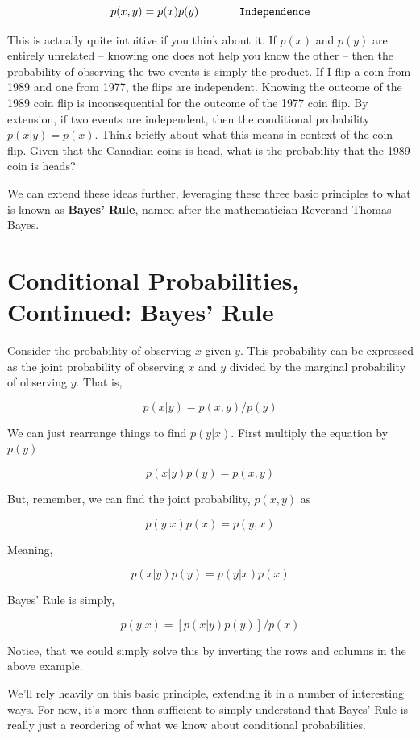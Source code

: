 \documentclass[
]{book}
\begin{document}
\[p(x,y)=p(x) p(y) \hspace{0.5in}  \texttt{Independence}\]

This is actually quite intuitive if you think about it. If \(p(x)\) and \(p(y)\) are entirely unrelated -- knowing one does not help you know the other -- then the probability of observing the two events is simply the product. If I flip a coin from 1989 and one from 1977, the flips are independent. Knowing the outcome of the 1989 coin flip is inconsequential for the outcome of the 1977 coin flip. By extension, if two events are independent, then the conditional probability \(p(x|y)=p(x)\). Think briefly about what this means in context of the coin flip. Given that the Canadian coins is head, what is the probability that the 1989 coin is heads?

We can extend these ideas further, leveraging these three basic principles to what is known as \textbf{Bayes' Rule}, named after the mathematician Reverand Thomas Bayes.

\section{Conditional Probabilities, Continued: Bayes' Rule}\label{conditional-probabilities-continued-bayes-rule}

Consider the probability of observing \(x\) given \(y\). This probability can be expressed as the joint probability of observing \(x\) and \(y\) divided by the marginal probability of observing \(y\). That is,

\[p(x|y)=p(x,y)/p(y)\]

We can just rearrange things to find \(p(y|x)\). First multiply the equation by \(p(y)\)

\[p(x|y) p(y)=p(x,y) \]

But, remember, we can find the joint probability, \(p(x,y)\) as

\[p(y|x) p(x)=p(y,x) \]

Meaning,

\[p(x|y) p(y)=p(y|x) p(x)\]

Bayes' Rule is simply,

\[p(y|x) =[p(x|y) p(y)]/p(x)\]

Notice, that we could simply solve this by inverting the rows and columns in the above example.

We'll rely heavily on this basic principle, extending it in a number of interesting ways. For now, it's more than sufficient to simply understand that Bayes' Rule is really just a reordering of what we know about conditional probabilities.
\end{document}
